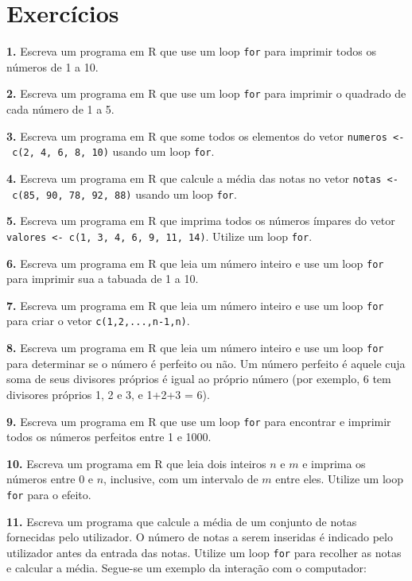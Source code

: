 \documentclass[
]{book}
\begin{document}
\section{Exercícios}\label{exercuxedcios-11}

\textbf{1.} Escreva um programa em R que use um loop \texttt{for} para imprimir
todos os números de 1 a 10.

\textbf{2.} Escreva um programa em R que use um loop \texttt{for} para imprimir o
quadrado de cada número de 1 a 5.

\textbf{3.} Escreva um programa em R que some todos os elementos do vetor
\texttt{numeros\ \textless{}-\ c(2,\ 4,\ 6,\ 8,\ 10)} usando um loop \texttt{for}.

\textbf{4.} Escreva um programa em R que calcule a média das notas no vetor
\texttt{notas\ \textless{}-\ c(85,\ 90,\ 78,\ 92,\ 88)} usando um loop \texttt{for}.

\textbf{5.} Escreva um programa em R que imprima todos os números ímpares do
vetor \texttt{valores\ \textless{}-\ c(1,\ 3,\ 4,\ 6,\ 9,\ 11,\ 14)}. Utilize um loop \texttt{for}.

\textbf{6.} Escreva um programa em R que leia um número inteiro e use um loop
\texttt{for} para imprimir sua a tabuada de 1 a 10.

\textbf{7.} Escreva um programa em R que leia um número inteiro e use um loop \texttt{for} para criar o vetor \texttt{c(1,2,...,n-1,n)}.

\textbf{8.} Escreva um programa em R que leia um número inteiro e use um loop
\texttt{for} para determinar se o número é perfeito ou não. Um número perfeito
é aquele cuja soma de seus divisores próprios é igual ao próprio número
(por exemplo, 6 tem divisores próprios 1, 2 e 3, e 1+2+3 = 6).

\textbf{9.} Escreva um programa em R que use um loop \texttt{for} para encontrar e
imprimir todos os números perfeitos entre 1 e 1000.

\textbf{10.} Escreva um programa em R que leia dois inteiros \(n\) e \(m\) e
imprima os números entre \(0\) e \(n\), inclusive, com um intervalo de \(m\)
entre eles. Utilize um loop \texttt{for} para o efeito.

\textbf{11.} Escreva um programa que calcule a média de um conjunto de notas
fornecidas pelo utilizador. O número de notas a serem inseridas é
indicado pelo utilizador antes da entrada das notas. Utilize um loop
\texttt{for} para recolher as notas e calcular a média. Segue-se um exemplo da
interação com o computador:
\end{document}
